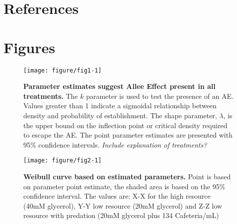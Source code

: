 \documentclass[a4paper,10pt]{article}\usepackage[]{graphicx}\usepackage[]{color}
\makeatletter
\def\maxwidth{ %
  \ifdim\Gin@nat@width>\linewidth
    \linewidth
  \else
    \Gin@nat@width
  \fi
}
\newenvironment{knitrout}{}{} %
\makeatother
\begin{document}
\section{References}

\section{Figures}












\begin{figure}[!h]
\begin{center}
\begin{knitrout}
\color{fgcolor}
\texttt{[image: figure/fig1-1]} 

\end{knitrout}
\end{center}
\caption{\textbf{Parameter estimates suggest Allee Effect present in all treatments.} The $k$ parameter is used to test the presence of an AE. Values greater than 1 indicate a sigmoidal relationship between density and probability of establishment. The shape parameter, $\lambda$, is the upper bound on the inflection point or critical density required to escape the AE. The point parameter estimates are presented with 95\% confidence intervals.  \textit{Include explanation of treatments?}
}
\end{figure}

\begin{figure}
\begin{center}
\begin{knitrout}
\color{fgcolor}
\texttt{[image: figure/fig2-1]} 

\end{knitrout}
\end{center}
\caption{\textbf{Weibull curve based on estimated parameters.} Point is based on parameter point estimate, the shaded area is based on the 95\% confidence interval. The values are: X-X for the high resource (40mM glycerol), Y-Y low resource (20mM glycerol) and Z-Z low resource with predation (20mM glycerol plus 134 Cafeteria/mL)  
}
\end{figure}
\end{document}
